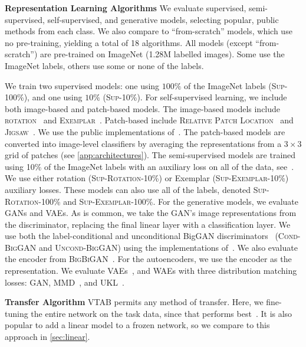 \textbf{Representation Learning Algorithms}\quad
We evaluate supervised, semi-supervised, self-supervised, and generative models, selecting popular, public methods from each class. We also compare to ``from-scratch'' models, which use no pre-training, yielding a total of 18 algorithms. All models (except ``from-scratch'') are pre-trained on ImageNet (1.28M labelled images). Some use the ImageNet labels, others use some or none of the labels.

We train two supervised models: one using $100\%$ of the ImageNet labels (\textsc{Sup-100\%}), and one using $10\%$ (\textsc{Sup-10\%}).
For self-supervised learning, we include both image-based and patch-based models. The image-based models include \textsc{rotation}~\citep{gidaris2018unsupervised} and \textsc{Exemplar}~\citep{dosovitskiy2014exemplar}.
Patch-based include
\textsc{Relative Patch Location}~\citep{doersch2015unsupervised} and \textsc{Jigsaw}~\citep{noroozi2016unsupervised}.
We use the public implementations of~\citet{kolesnikov2019revisiting}.
The patch-based models are converted into image-level classifiers by averaging the representations from a $3\times3$ grid of patches (see \ref{app:architectures}).
The semi-supervised models are trained using 10\% of the ImageNet labels with an auxiliary loss on all of the data, see~\citep{zhai2019s4l}. We use either rotation (\textsc{Sup-Rotation-10\%}) or Exemplar (\textsc{Sup-Exemplar-10\%}) auxiliary losses. These models can also use all of the labels, denoted \textsc{Sup-Rotation-100\%} and \textsc{Sup-Exemplar-100\%}.
For the generative models, we evaluate GANs and VAEs. As is common, we take the GAN's image representations from the discriminator, replacing the final linear layer with a classification layer. We use both the label-conditional and unconditional BigGAN discriminators~\citep{brock2018large} (\textsc{Cond-BigGAN} and \textsc{Uncond-BigGAN}) using the implementations of~\citet{chen2019self,lucic2019high}.
We also evaluate the encoder from \textsc{BigBiGAN}~\citep{donahue2019large}.
For the autoencoders, we use the encoder as the representation. We evaluate VAEs~\citep{kingma2013auto}, and WAEs with three distribution matching losses: GAN, MMD~\citep{tolstikhin2017wasserstein}, and UKL~\citep{rubenstein2019practical}.

\textbf{Transfer Algorithm}\quad
VTAB permits any method of transfer. Here, we fine-tuning the entire network on the task data, since that performs best~\citep{kornblith2018better}. It is also popular to add a linear model to a frozen network, so we compare to this approach in \ref{sec:linear}.

